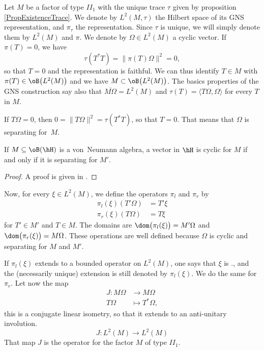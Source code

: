 Let $M$ be a factor of type $II_1$ with the unique trace $\tau$ given by proposition \ref{PropExistenceTrace}. We denote by $L^2(M,\tau)$ the Hilbert space of its GNS representation, and $\pi_{\tau}$ the representation. Since $\tau$ is unique, we will simply denote them by $L^2(M)$ and $\pi$. We denote by $\Omega\in L^2(M)$ a cyclic vector. If $\pi(T)=0$, we have
\[ 
	\tau(T^*T)=\| \pi(T)\Omega \|^2=0,
\]
so that $T=0$ and the representation is faithful. We can thus identify $T\in M$ with $\pi(T)\in \oB\big( L^2(M) \big)$ and we have $M\subset\oB\big( L^2(M) \big)$. The basics properties of the GNS construction say also that $\overline{ M\Omega }=L^2(M)$ and $\tau(T)=\langle T\Omega, \Omega\rangle $ for every $T$ in $M$. 

If $T\Omega=0$, then $0=\| T\Omega \|^2=\tau(T^*T)$, so that $T=0$. That means that $\Omega$ is separating for~$M$.

\begin{lemma}
If $M\subseteq\oB(\hH)$ is a von~Neumann algebra, a vector in $\hH$ is cyclic for $M$ if and only if it is separating for $M'$.
\end{lemma}
\begin{proof}
A proof is given in \cite{JonesSunder}.
\end{proof}

Now, for every $\xi\in L^2(M)$, we define the operators $\pi_l$ and $\pi_r$ by
\begin{subequations}
\begin{align}
	\pi_l(\xi)(T'\Omega)&= T'\xi\\
	\pi_r(\xi)(T\Omega) &= T\xi
\end{align}
\end{subequations}
for $T'\in M'$ and $T\in M$. The domains are $\dom\big( \pi_l(\xi) \big)=M'\Omega$ and $\dom\big( \pi_r(\xi) \big)=M\Omega$. These operations are well defined because $\Omega$ is cyclic and separating for $M$ and $M'$.

If $\pi_l(\xi)$ extends to a bounded operator on $L^2(M)$, one says that $\xi$ is ., and the (necessarily unique) extension is still denoted by $\pi_l(\xi)$. We do the same for $\pi_r$. Let now the map
\begin{equation}
\begin{aligned}
 J\colon M\Omega&\to M\Omega \\ 
   T\Omega&\mapsto T^*\Omega, 
\end{aligned}
\end{equation}
this is a conjugate linear isometry, so that it extends to an anti-unitary involution.
\begin{equation}
	J\colon L^2(M)\to L^2(M)
\end{equation}
That map $J$ is the  operator for the factor $M$ of type $II_1$.

